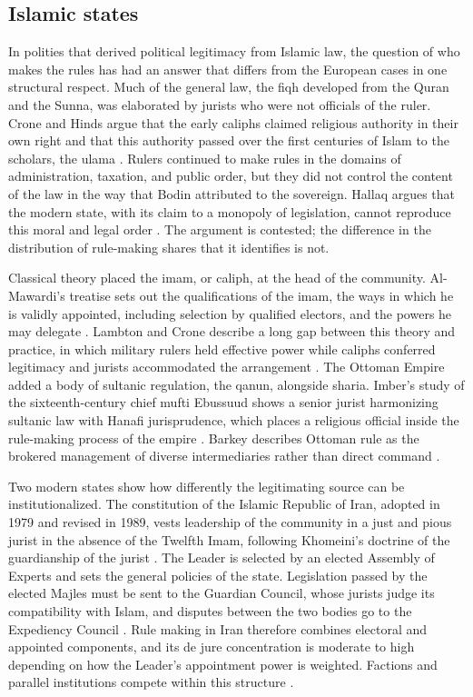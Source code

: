 \documentclass[11pt,letterpaper]{article}
\theoremstyle{definition}
\theoremstyle{remark}
\begin{document}
\subsection{Islamic states}

In polities that derived political legitimacy from Islamic law, the question of who makes the rules has had an answer that differs from the European cases in one structural respect. Much of the general law, the fiqh developed from the Quran and the Sunna, was elaborated by jurists who were not officials of the ruler. Crone and Hinds argue that the early caliphs claimed religious authority in their own right and that this authority passed over the first centuries of Islam to the scholars, the ulama \citep{crone1986}. Rulers continued to make rules in the domains of administration, taxation, and public order, but they did not control the content of the law in the way that Bodin attributed to the sovereign. Hallaq argues that the modern state, with its claim to a monopoly of legislation, cannot reproduce this moral and legal order \citep{hallaq2013}. The argument is contested; the difference in the distribution of rule-making shares that it identifies is not.

Classical theory placed the imam, or caliph, at the head of the community. Al-Mawardi's treatise sets out the qualifications of the imam, the ways in which he is validly appointed, including selection by qualified electors, and the powers he may delegate \citep{mawardi1996}. Lambton and Crone describe a long gap between this theory and practice, in which military rulers held effective power while caliphs conferred legitimacy and jurists accommodated the arrangement \citep{lambton1981,crone2004}. The Ottoman Empire added a body of sultanic regulation, the qanun, alongside sharia. Imber's study of the sixteenth-century chief mufti Ebussuud shows a senior jurist harmonizing sultanic law with Hanafi jurisprudence, which places a religious official inside the rule-making process of the empire \citep{imber1997}. Barkey describes Ottoman rule as the brokered management of diverse intermediaries rather than direct command \citep{barkey2008}.

Two modern states show how differently the legitimating source can be institutionalized. The constitution of the Islamic Republic of Iran, adopted in 1979 and revised in 1989, vests leadership of the community in a just and pious jurist in the absence of the Twelfth Imam, following Khomeini's doctrine of the guardianship of the jurist \citep{iranconst,khomeini1981}. The Leader is selected by an elected Assembly of Experts and sets the general policies of the state. Legislation passed by the elected Majles must be sent to the Guardian Council, whose jurists judge its compatibility with Islam, and disputes between the two bodies go to the Expediency Council \citep{iranconst,schirazi1997}. Rule making in Iran therefore combines electoral and appointed components, and its de jure concentration is moderate to high depending on how the Leader's appointment power is weighted. Factions and parallel institutions compete within this structure \citep{brumberg2001,buchta2000}.
\end{document}
